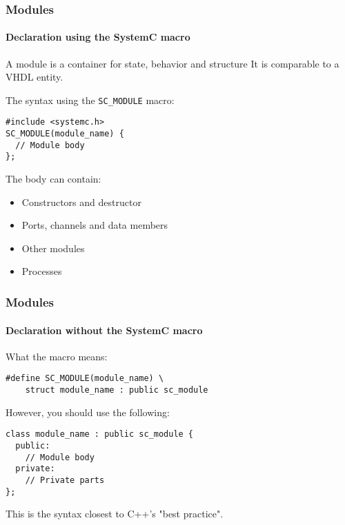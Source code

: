 \begin{frame}[fragile]
\frametitle{Modules}
\framesubtitle{Declaration using the SystemC macro}

\begin{block}{A module is a container for state, behavior and structure}
It is comparable to a VHDL entity.
\end{block}
\pause
\begin{block}{The syntax using the \texttt{SC\_MODULE} macro:}
\vspace{-1em}
\begin{verbatim}
#include <systemc.h>
SC_MODULE(module_name) {
  // Module body
};
\end{verbatim}
\vspace{-1em}
\end{block}
\pause
\begin{block}{The body can contain:}
\vspace{-0.5em}
\begin{itemize}
\item Constructors and destructor
\item Ports, channels and data members
\item Other modules
\item Processes
\end{itemize}
\vspace{-0.5em}
\end{block}
\end{frame}

\begin{frame}[fragile]
\frametitle{Modules}
\framesubtitle{Declaration without the SystemC macro}

\begin{block}{What the macro means:}
\vspace{-1em}
\begin{verbatim}
#define SC_MODULE(module_name) \
    struct module_name : public sc_module
\end{verbatim}
\vspace{-1em}
\end{block}
\pause
\begin{block}{However, you should use the following:}
\vspace{-1em}
\begin{verbatim}
class module_name : public sc_module {
  public:
    // Module body
  private:
    // Private parts
};
\end{verbatim}
This is the syntax closest to C++'s "best practice".
\end{block}
\end{frame}

